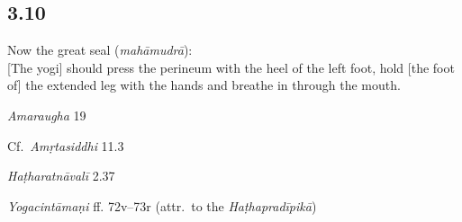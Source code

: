 \begin{ekdosis}

\subsection*{3.10}
\begin{translation}[hp03_010]
Now the great seal (\emph{mahāmudrā}):\\
{}[The yogi] should press the perineum with the heel of the left foot, hold [the foot of] the extended leg with the hands and breathe in through the mouth.
\end{translation}

\begin{sources}[hp03_010]
\emph{Amaraugha} 19
\begin{versinnote}
\tl{\var{dhṛtvā ] kṛtvā \vl}\\!}
\end{versinnote}

Cf.~\emph{Amṛtasiddhi} 11.3
\begin{versinnote}
\end{versinnote}
\end{sources}

\begin{testimonia}[hp03_010]
\emph{Haṭharatnāvalī} 2.37
\begin{versinnote}
\tl{\var{mukham ] mukhe \vl}\\!}
\end{versinnote}

\emph{Yogacintāmaṇi} ff. 72v–73r (attr.~to the \emph{Haṭhapradīpikā})
\begin{versinnote}
\end{versinnote}


\end{testimonia}
\end{ekdosis}
